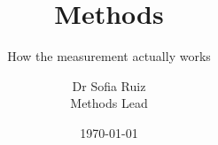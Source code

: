 \documentclass[aspectratio=169,11pt]{beamer}
\title{Methods}
\subtitle{How the measurement actually works}
\author{Dr Sofia Ruiz \\ \small Methods Lead}
\date{\today}
\begin{document}
\titleslide






\end{document}
